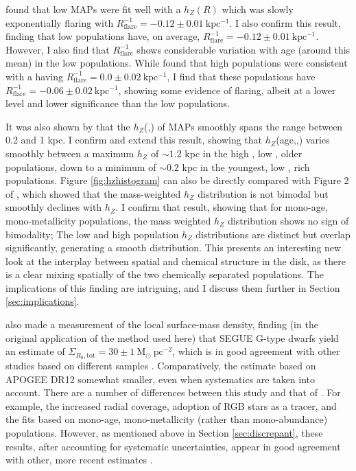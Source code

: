 \citet{2016ApJ...823...30B} found that low \afe{} MAPs were fit well with a $h_Z(R)$ which was slowly exponentially flaring with $R_{\mathrm{flare}}^{-1} = -0.12 \pm 0.01 \ \mathrm{kpc^{-1}}$. I also confirm this result, finding that low \afe{} populations have, on average, $R_{\mathrm{flare}}^{-1} = -0.12 \pm 0.01 \ \mathrm{kpc^{-1}}$. However, I also find that $R_{\mathrm{flare}}^{-1}$ shows considerable variation with age (around this mean) in the low \afe{} populations. While \citet{2016ApJ...823...30B} found that high \afe{} populations were consistent with a having $R_{\mathrm{flare}}^{-1} = 0.0 \pm 0.02\ \mathrm{kpc^{-1}}$, I find that these populations have $R_{\mathrm{flare}}^{-1} = -0.06 \pm 0.02\ \mathrm{kpc^{-1}}$, showing some evidence of flaring, albeit at a lower level and lower significance than the low \afe{} populations.

 It was also shown by \citet{2012ApJ...753..148B,2016ApJ...823...30B} that the $h_Z$(\afe{},\feh{}) of MAPs smoothly spans the range between 0.2 and 1 kpc. I confirm and extend this result, showing that $h_Z$(age,\afe{},\feh{}) varies smoothly between a maximum $h_Z$ of $\sim 1.2$ kpc in the high \afe{}, low \feh{}, older populations, down to a minimum of $\sim 0.2$ kpc in the youngest, low \afe{}, \feh{} rich populations. Figure \ref{fig:hzhistogram} can also be directly compared with Figure 2 of \citet{2012ApJ...751..131B}, which showed that the mass-weighted $h_Z$ distribution is not bimodal but smoothly declines with $h_Z$. I confirm that result, showing that for mono-age, mono-metallicity populations, the mass weighted $h_Z$ distribution shows no sign of bimodality; The low and high \afe{} population $h_Z$ distributions are distinct but overlap significantly, generating a smooth distribution. This presents an interesting new look at the interplay between spatial and chemical structure in the disk, as there is a clear mixing spatially of the two chemically separated populations. The implications of this finding are intriguing, and I discuss them further in Section \ref{sec:implications}.

\citet{2012ApJ...751..131B} also made a measurement of the local surface-mass density, finding (in the original application of the method used here) that SEGUE G-type dwarfs yield an estimate of $\Sigma_{R_0,\text{tot}} = 30 \pm 1\ \mathrm{M_{\odot}\ pc^{-2}}$, which is in good agreement with other studies based on different samples \citep[e.g.][]{2006MNRAS.372.1149F,2015ApJ...814...13M}.  Comparatively, the estimate based on APOGEE DR12 somewhat smaller, even when systematics are taken into account. There are a number of differences between this study and that of \citet{2012ApJ...751..131B}. For example, the increased radial coverage, adoption of RGB stars as a tracer, and the fits based on mono-age, mono-metallicity (rather than mono-abundance) populations. However, as mentioned above in Section \ref{sec:discrepant}, these results, after accounting for systematic uncertainties, appear in good agreement with other, more recent estimates \citep{2015ApJ...814...13M}. 


